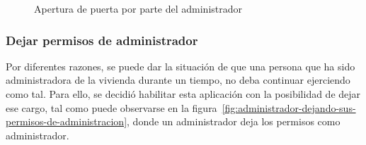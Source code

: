 \begin{figure}[tbp]
\caption{Apertura de puerta por parte del administrador}
\label{fig:apertura-de-puerta-por-parte-del-administrador}
\end{figure}

\subsubsection{Dejar permisos de administrador}

Por diferentes razones, se puede dar la situación de que una persona que ha sido administradora de la vivienda durante un tiempo, no deba continuar ejerciendo como tal. Para ello, se decidió habilitar esta aplicación con la posibilidad de dejar ese cargo, tal como puede observarse en la figura~\ref{fig:administrador-dejando-sus-permisos-de-administracion}, donde un administrador deja los permisos como administrador.

